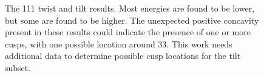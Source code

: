 \documentclass[twoside,senior]{BYUPhys}
\begin{document}
\begin{figure}[ht!]
 \centering
 
 \quad
 \caption[Results for the \textlangle{}111\textrangle{} fitting.]{\label{fig:111} The \textlangle{}111\textrangle{} twist \protect{} and tilt \protect{} results.  Most energies are found to be lower, but some are found to be higher.  The unexpected positive concavity present in these results could indicate the presence of one or more cusps, with one possible location around 33\textdegree{}.  This work needs additional data to determine possible cusp locations for the tilt subset.}
 
\end{figure}
\end{document}
